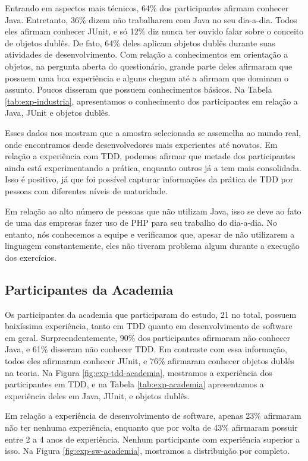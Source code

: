 Entrando em aspectos mais técnicos, 64\% dos participantes afirmam conhecer Java. Entretanto,
36\% dizem não trabalharem com Java no seu dia-a-dia. Todos eles afirmam conhecer JUnit,
e só 12\% diz nunca ter ouvido falar sobre o conceito de objetos dublês. De fato, 64\% deles
aplicam objetos dublês durante suas atividades de desenvolvimento. Com relação a conhecimentos
em orientação a objetos, na pergunta aberta do questionário, grande parte deles 
afirmaram que possuem uma boa experiência e alguns
chegam até a afirmam que dominam o assunto. Poucos disseram que possuem conhecimentos
básicos. Na Tabela \ref{tab:exp-industria},
apresentamos o conhecimento dos participantes em relação a Java, JUnit e objetos dublês.

Esses dados nos mostram que a amostra selecionada se assemelha ao mundo real, onde
encontramos desde desenvolvedores mais experientes até novatos. Em relação a experiência com TDD,
podemos afirmar que metade dos participantes ainda está experimentando a prática, enquanto
outros já a tem mais consolidada. Isso é positivo, já que foi possível capturar informações
da prática de TDD por pessoas com diferentes níveis de maturidade.

Em relação ao alto número de pessoas que não utilizam Java, isso se deve ao fato de uma das
empresas fazer uso de PHP para seu trabalho do dia-a-dia. No entanto, nós conhecemos a equipe
e verificamos que, apesar de não utilizarem a linguagem constantemente, eles não tiveram
problema algum durante a execução dos exercícios.

\subsection{Participantes da Academia}
\label{findings-desc-industria}

Os participantes da academia que participaram do estudo, 21 no total, possuem baixíssima experiência,
tanto em TDD quanto em desenvolvimento de software em geral. Surpreendentemente, 90\%
dos participantes afirmaram não conhecer Java, e 61\% disseram não conhecer TDD.
Em contraste com essa informação, todos eles afirmaram conhecer JUnit, e 76\% afirmaram
conhecer objetos dublês na teoria. 
Na Figura \ref{fig:exp-tdd-academia}, mostramos a experiência dos participantes em TDD, e
na Tabela \ref{tab:exp-academia} apresentamos a experiência deles em Java, JUnit, e objetos
dublês.

Em relação a experiência de desenvolvimento de software, apenas 23\% afirmaram não
ter nenhuma experiência, enquanto que por volta de 43\% afirmaram possuir
entre 2 a 4 anos de experiência. Nenhum participante com experiência superior a isso.
Na Figura \ref{fig:exp-sw-academia}, mostramos a distribuição por completo.

